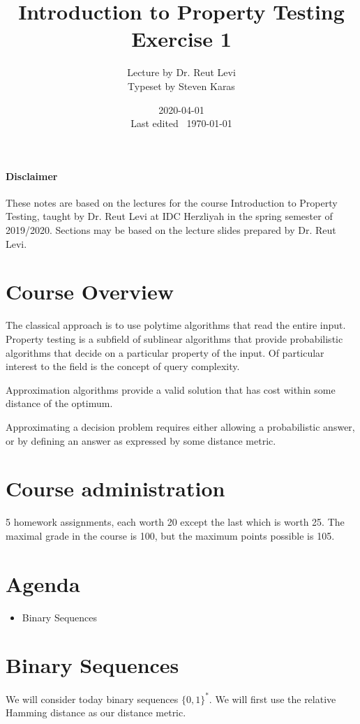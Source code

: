 \documentclass{idc_msc}
\title{Introduction to Property Testing \\\large Exercise 1}
\date{2020-04-01 \\ Last edited \currenttime\ \today}
\author{Lecture by Dr. Reut Levi\\Typeset by Steven Karas}
\begin{document}
\nocite{goldreich2017introduction}

\paragraph{Disclaimer}

These notes are based on the lectures for the course Introduction to Property Testing, taught by Dr. Reut Levi at IDC Herzliyah in the spring semester of 2019/2020.
Sections may be based on the lecture slides prepared by Dr. Reut Levi.

\section{Course Overview}

  The classical approach is to use polytime algorithms that read the entire input.
  Property testing is a subfield of sublinear algorithms that provide probabilistic algorithms that decide on a particular property of the input.
  Of particular interest to the field is the concept of query complexity.

  Approximation algorithms provide a valid solution that has cost within some distance of the optimum.

  Approximating a decision problem requires either allowing a probabilistic answer, or by defining an answer as expressed by some distance metric.

\section{Course administration}

  5 homework assignments, each worth 20 except the last which is worth 25.
  The maximal grade in the course is 100, but the maximum points possible is 105.

\section{Agenda}

  \begin{itemize}
    \item Binary Sequences
  \end{itemize}

\section{Binary Sequences}

We will consider today binary sequences \({\{0, 1\}}^{*}\).
We will first use the relative Hamming distance as our distance metric.
\end{document}
